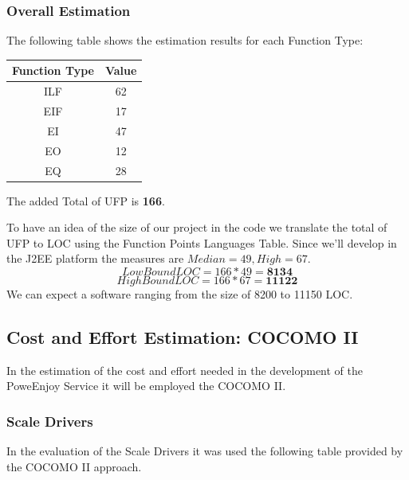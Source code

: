\documentclass[a4paper]{article}
\begin{document}
\subsubsection{Overall Estimation}
 The following table shows the estimation results for each Function Type:
\begin{center}
\begin{tabular}{ | c | c | }
\hline
	\textbf{Function Type} & \textbf{Value}\\ \hline\hline
	ILF & 62 \\ \hline
	EIF & 17 \\ \hline
	EI & 47 \\ \hline
	EO & 12 \\ \hline
	EQ & 28 \\ \hline
\end{tabular}
\end{center}
The added Total of UFP is \textbf{166}.\newline
\par
To have an idea of the size of our project in the code we translate the total of UFP to LOC using the Function Points Languages Table. Since we'll develop in the J2EE platform the measures are \(Median = 49, High = 67\).
\[Low Bound LOC = 166 * 49 = \textbf{8134}\]
\[High Bound LOC = 166 * 67 = \textbf{11122}\]
We can expect a software ranging from the size of 8200 to 11150 LOC.

\subsection{Cost and Effort Estimation: COCOMO II}
In the estimation of the cost and effort needed in the development of the PoweEnjoy Service it will be employed the COCOMO II.
\subsubsection{Scale Drivers}
In the evaluation of the Scale Drivers it was used the following table provided by the COCOMO II approach.
\end{document}
